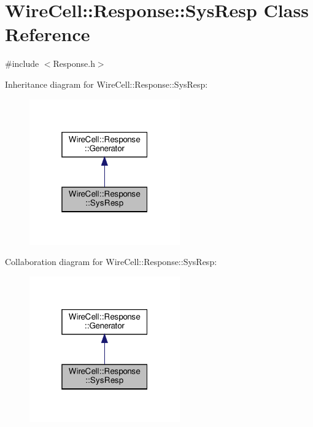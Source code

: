 \hypertarget{class_wire_cell_1_1_response_1_1_sys_resp}{}\section{Wire\+Cell\+:\+:Response\+:\+:Sys\+Resp Class Reference}
\label{class_wire_cell_1_1_response_1_1_sys_resp}


{\ttfamily \#include $<$Response.\+h$>$}



Inheritance diagram for Wire\+Cell\+:\+:Response\+:\+:Sys\+Resp\+:
\nopagebreak
\begin{figure}[H]
\begin{center}
\leavevmode
\includegraphics[width=184pt]{class_wire_cell_1_1_response_1_1_sys_resp__inherit__graph}
\end{center}
\end{figure}


Collaboration diagram for Wire\+Cell\+:\+:Response\+:\+:Sys\+Resp\+:
\nopagebreak
\begin{figure}[H]
\begin{center}
\leavevmode
\includegraphics[width=184pt]{class_wire_cell_1_1_response_1_1_sys_resp__coll__graph}
\end{center}
\end{figure}
